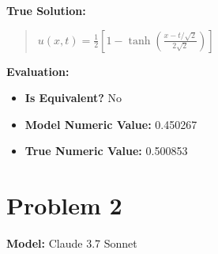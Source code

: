 \documentclass{article}
\begin{document}
\textbf{True Solution:}
\begin{quote}
$u(x, t) = \frac{1}{2} \left[ 1 - \tanh\left( \frac{x - t/\sqrt{2}}{2\sqrt{2}} \right) \right]$
\end{quote}

\textbf{Evaluation:}
\begin{itemize}
\item \textbf{Is Equivalent?} No
\item \textbf{Model Numeric Value:} 0.450267
\item \textbf{True Numeric Value:} 0.500853
\end{itemize}
\vspace{1cm}
\section*{Problem 2}
\textbf{Model:} Claude 3.7 Sonnet
\end{document}
